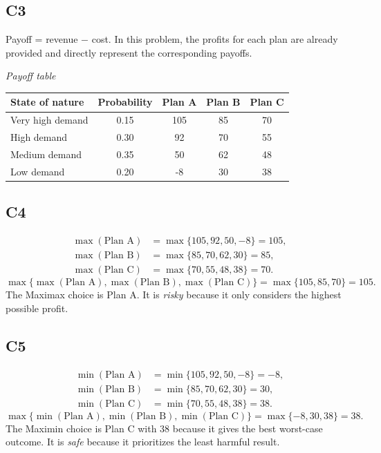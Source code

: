 		\subsection*{C3}
		Payoff = revenue $-$ cost. In this problem, the profits for each plan are already provided and directly represent the corresponding payoffs.
		\begin{center}
			\textit{Payoff table} \\
			\begin{tabular}{l c c c c}
				\toprule
				State of nature & Probability & Plan A & Plan B & Plan C \\
				\midrule
				Very high demand & 0.15 & 105 & 85 & 70 \\
				High demand & 0.30 & 92 & 70 & 55 \\
				Medium demand & 0.35 & 50 & 62 & 48 \\
				Low demand & 0.20 & -8 & 30 & 38 \\
				\bottomrule
			\end{tabular}
		\end{center}

		\subsection*{C4}
		\[
		\begin{aligned}
		\max(\text{Plan A}) &= \max\{105,92,50,-8\} = 105,\\
		\max(\text{Plan B}) &= \max\{85,70,62,30\} = 85,\\
		\max(\text{Plan C}) &= \max\{70,55,48,38\} = 70.
		\end{aligned}
		\]
		\[
		\max\{\max(\text{Plan A}), \max(\text{Plan B}), \max(\text{Plan C})\}
		= \max\{105, 85, 70\}
		= 105.
		\]
		The Maximax choice is Plan A. It is \emph{risky} because it only considers the highest possible profit.

		\subsection*{C5}
		\[
		\begin{aligned}
		\min(\text{Plan A}) &= \min\{105,92,50,-8\} = -8,\\
		\min(\text{Plan B}) &= \min\{85,70,62,30\} = 30,\\
		\min(\text{Plan C}) &= \min\{70,55,48,38\} = 38.
		\end{aligned}
		\]
		\[
		\max\{\min(\text{Plan A}), \min(\text{Plan B}), \min(\text{Plan C})\}
		= \max\{-8, 30, 38\}
		= 38.
		\]
		The Maximin choice is Plan C with 38 because it gives the best worst-case outcome. It is \emph{safe} because it prioritizes the least harmful result.


